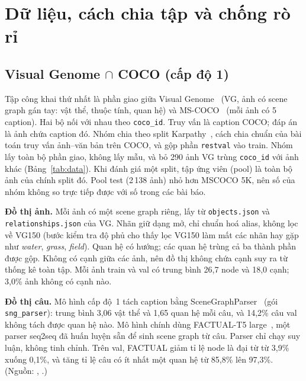 \section{Dữ liệu, cách chia tập và chống rò rỉ}
\label{sec:data}

\subsection{Visual Genome $\cap$ COCO (cấp độ 1)}
\label{sec:data-vg}

Tập công khai thứ nhất là phần giao giữa Visual Genome~\cite{krishna2017vg} (VG, ảnh có scene graph gán tay: vật thể,
thuộc tính, quan hệ) và MS-COCO~\cite{lin2014coco} (mỗi ảnh có 5 caption). Hai bộ nối với nhau theo \texttt{coco\_id}. Truy
vấn là caption COCO; đáp án là ảnh chứa caption đó. Nhóm chia theo split Karpathy~\cite{karpathy2015deep}, cách chia chuẩn
của bài toán truy vấn ảnh--văn bản trên COCO, và gộp phần \texttt{restval} vào train. Nhóm lấy toàn bộ phần giao, không
lấy mẫu, và bỏ 290 ảnh VG trùng \texttt{coco\_id} với ảnh khác (Bảng~\ref{tab:data}). Khi đánh giá một split, tập ứng viên
(pool) là toàn bộ ảnh của chính split đó. Pool test (2\,138 ảnh) nhỏ hơn MSCOCO 5K, nên số của nhóm không so trực tiếp được
với số trong các bài báo.

\textbf{Đồ thị ảnh.} Mỗi ảnh có một scene graph riêng, lấy từ \texttt{objects.json} và \texttt{relationships.json} của VG.
Nhãn giữ dạng mở, chỉ chuẩn hoá alias, không lọc về VG150 (bước kiểm tra độ phủ cho thấy lọc VG150 làm mất các nhãn hay
gặp như \emph{water}, \emph{grass}, \emph{field}). Quan hệ có hướng; các quan hệ trùng cả ba thành phần được gộp. Không có
cạnh giữa các ảnh, nên đồ thị không chứa cạnh suy ra từ thống kê toàn tập. Mỗi ảnh train và val có trung bình 26,7 node và
18,0 cạnh; 3,0\% ảnh không có cạnh nào.

\textbf{Đồ thị câu.} Mô hình cấp độ~1 tách caption bằng SceneGraphParser~\cite{schuster2015sgparser} (gói
\texttt{sng\_parser}): trung bình 3,06 vật thể và 1,65 quan hệ mỗi câu, và 14,2\% câu val không tách được quan hệ nào. Mô
hình chính dùng FACTUAL-T5 large~\cite{li2023factual}, một parser seq2seq đã huấn luyện sẵn để sinh scene graph từ câu.
Parser chỉ chạy suy luận, không tinh chỉnh. Trên val, FACTUAL giảm tỉ lệ node là đại từ từ 3,9\% xuống 0,1\%, và tăng tỉ lệ
câu có ít nhất một quan hệ từ 85,8\% lên 97,3\%. (Nguồn: ,
.)

